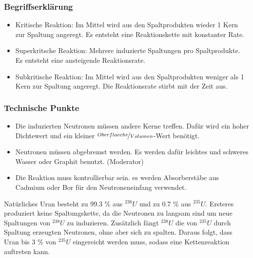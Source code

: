 \documentclass[Ex4_Zusammenfassung.tex]{subfiles}
\begin{document}
\subsubsection{Begriffserklärung}
\begin{itemize}
\item Kritische Reaktion: Im Mittel wird aus den Spaltprodukten wieder 1 Kern zur Spaltung angeregt. Es entsteht eine Reaktionskette mit konstanter Rate. 
\item Superkritsche Reaktion: Mehrere induzierte Spaltungen pro Spaltprodukte. Es entsteht eine ansteigende Reaktionsrate. 
\item Subkritische Reaktion: Im Mittel wird aus den Spaltprodukten weniger als 1 Kern zur Spaltung angeregt. Die Reaktionsrate stirbt mit der Zeit aus. 
\end{itemize}

\subsubsection{Technische Punkte}
\begin{itemize}
\item Die induzierten Neutronen müssen andere Kerne treffen. Dafür wird ein hoher Dichtewert und ein kleiner $\nicefrac{Oberflaeche}{Volumen}$-Wert benötigt.
\item Neutronen müssen abgebremst werden. Es werden dafür leichtes und schweres Wasser oder Graphit benutzt. (Moderator)
\item Die Reaktion muss kontrollierbar sein. es werden Absorberstäbe aus Cadmium oder Bor für den Neutroneneinfang verwendet. 
\end{itemize}
Natürliches Uran besteht zu 99.3 \% aus $^{238} U$ und zu 0.7 \% aus $^{235} U $. Ersteres produziert keine Spaltungskette, da die Neutronen zu langsam sind um neue Spaltungen von $^{238} U$ zu induzieren. Zusätzlich fängt $^{238} U$ die von $^{235} U $ durch Spaltung erzeugten Neutronen, ohne aber sich zu spalten. Daraus folgt, dass Uran bis 3 \% von $ ^{235} U$ eingereicht werden muss, sodass eine Kettenreaktion auftreten kann.
\end{document}
